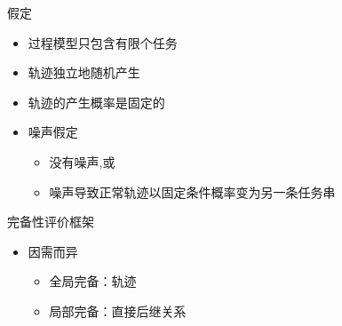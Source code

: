 \documentclass[CJK,final,t]{beamer}
\begin{document}
\begin{frame}{}
\begin{columns}[t]
\begin{column}{.3\linewidth}
      \begin{block}{假定}
            \begin{itemize}
            \item 过程模型只包含有限个任务 
            \item 轨迹独立地随机产生 
            \item 轨迹的产生概率是固定的
			\item 噪声假定
              \begin{itemize}
              \item 没有噪声,或
              \item 噪声导致正常轨迹以固定条件概率变为另一条任务串
              \end{itemize}
           \end{itemize}
      \end{block}

      \begin{block}{完备性评价框架}
            \begin{itemize}
            \item 因需而异
              \begin{itemize}
              \item 全局完备：轨迹
              \item 局部完备：直接后继关系
              \end{itemize}
            \end{itemize}


\end{block}
\end{column}
\end{columns}
\end{frame}
\end{document}
